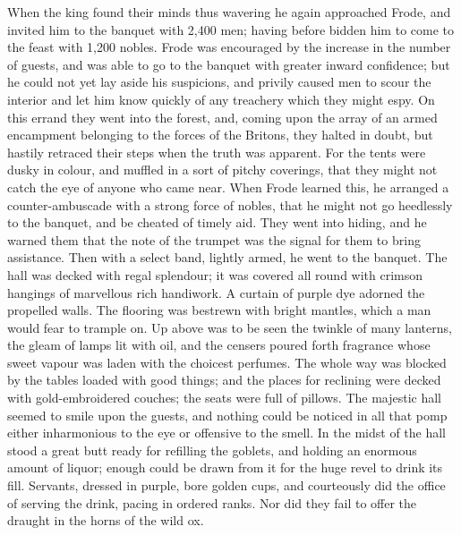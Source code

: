 \documentclass[10pt,a4paper]{report}
\begin{document}
When the king found their minds thus wavering he again approached Frode, and invited him to the banquet with 2,400 men; having before bidden him to come to the feast with 1,200 nobles. Frode was encouraged by the increase in the number of guests, and was able to go to the banquet with greater inward confidence; but he could not yet lay aside his suspicions, and privily caused men to scour the interior and let him know quickly of any treachery which they might espy. On this errand they went into the forest, and, coming upon the array of an armed encampment belonging to the forces of the Britons, they halted in doubt, but hastily retraced their steps when the truth was apparent. For the tents were dusky in colour, and muffled in a sort of pitchy coverings, that they might not catch the eye of anyone who came near. When Frode learned this, he arranged a counter-ambuscade with a strong force of nobles, that he might not go heedlessly to the banquet, and be cheated of timely aid. They went into hiding, and he warned them that the note of the trumpet was the signal for them to bring assistance. Then with a select band, lightly armed, he went to the banquet. The hall was decked with regal splendour; it was covered all round with crimson hangings of marvellous rich handiwork. A curtain of purple dye adorned the propelled walls. The flooring was bestrewn with bright mantles, which a man would fear to trample on. Up above was to be seen the twinkle of many lanterns, the gleam of lamps lit with oil, and the censers poured forth fragrance whose sweet vapour was laden with the choicest perfumes. The whole way was blocked by the tables loaded with good things; and the places for reclining were decked with gold-embroidered couches; the seats were full of pillows. The majestic hall seemed to smile upon the guests, and nothing could be noticed in all that pomp either inharmonious to the eye or offensive to the smell. In the midst of the hall stood a great butt ready for refilling the goblets, and holding an enormous amount of liquor; enough could be drawn from it for the huge revel to drink its fill. Servants, dressed in purple, bore golden cups, and courteously did the office of serving the drink, pacing in ordered ranks. Nor did they fail to offer the draught in the horns of the wild ox.\\
\end{document}

